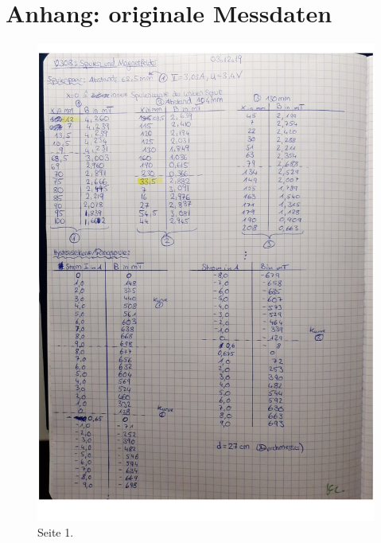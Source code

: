\section*{Anhang: originale Messdaten}
\label{sec:Anhang}
\begin{figure}
    \centering
    \includegraphics[width=\textwidth]{content/Data2_pic.pdf}
    \caption{Seite 1.}
    \label{fig:data1}
\end{figure}
\pagebreak
